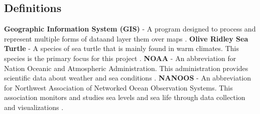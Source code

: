 \documentclass[onecolumn, draftclsnofoot,10pt, compsoc]{IEEEtran}
\begin{document}
\begin{singlespace}
\subsection{Definitions}
    \textbf{Geographic Information System (GIS)} - A program designed to process and represent multiple forms of dataand layer them over maps \cite{2008Gfed}. \newline \newline
    \textbf{Olive Ridley Sea Turtle} - A species of sea turtle that is mainly found in warm climates. This species is the primary focus for this project \cite{noaa}. \newline \newline
    \textbf{NOAA} - An abbreviation for Nation Oceanic and Atmospheric Administration. This administration provides scientific data about weather and sea conditions \cite{noaa}. \newline \newline
    \textbf{NANOOS} - An abbreviation for Northwest Association of Networked Ocean Observation Systems.  This association monitors and studies sea levels and sea life through data collection and visualizations \cite{nanoos}.

\end{singlespace}
\end{document}
